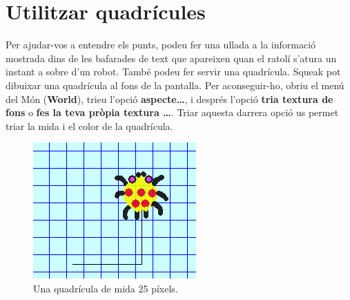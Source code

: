 
\section{Utilitzar quadrícules}
Per ajudar-vos a entendre els punts, podeu fer una ullada a la informació mostrada dins de les bafarades de text que apareixen quan el ratolí s'atura un instant a sobre d'un robot. També podeu fer servir una quadrícula. Squeak pot dibuixar una quadrícula al fons de la pantalla. Per aconseguir-ho, obriu el menú del Món (\textbf{World}), trieu l'opció \textbf{aspecte\dots}, i després l'opció \textbf{tria textura de fons} o \textbf{fes la teva pròpia textura \dots}. Triar aquesta darrera opció us permet triar la mida i el color de la quadrícula.
\begin{figure}[h!]
\begin{center}
\includegraphics[scale=0.75]{Imatges/figura21-2}
\end{center}
\caption{Una quadrícula de mida 25 píxels.}
\label{fig2102}
\end{figure}

